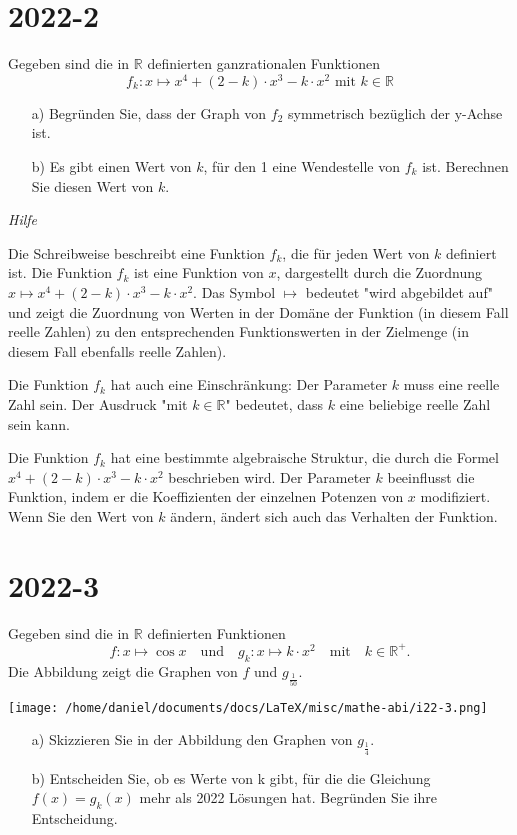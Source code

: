 \documentclass{article}
\begin{document}
\clearpage

\section*{2022-2}
Gegeben sind die in $\mathbb{R}$ definierten ganzrationalen Funktionen
\[f_k:x \mapsto x^4 + (2-k) \cdot x^3 -k \cdot x^2 \text{ mit } k\in\mathbb{R}\]

\begin{enumerate}
  \item[a)] Begr\"unden Sie, dass der Graph von $f_2$ symmetrisch bez\"uglich der y-Achse ist.

  \item[b)] Es gibt einen Wert von $k$, f\"ur den 1 eine Wendestelle von $f_k$
    ist. Berechnen Sie diesen Wert von $k$.
\end{enumerate}

\vfill

\textit{Hilfe}

Die Schreibweise beschreibt eine Funktion $f_k$, die für jeden Wert von $k$
definiert ist. Die Funktion $f_k$ ist eine Funktion von $x$, dargestellt durch
die Zuordnung $x\mapsto x^4 + (2-k) \cdot x^3 -k \cdot x^2$. Das Symbol
$\mapsto$ bedeutet "wird abgebildet auf" und zeigt die Zuordnung von Werten in
der Domäne der Funktion (in diesem Fall reelle Zahlen) zu den entsprechenden
Funktionswerten in der Zielmenge (in diesem Fall ebenfalls reelle Zahlen).

Die Funktion $f_k$ hat auch eine Einschränkung: Der Parameter $k$ muss eine
reelle Zahl sein. Der Ausdruck "mit $k\in\mathbb{R}$" bedeutet, dass $k$ eine
beliebige reelle Zahl sein kann.

Die Funktion $f_k$ hat eine bestimmte algebraische Struktur, die durch die
Formel $x^4 + (2-k) \cdot x^3 -k \cdot x^2$ beschrieben wird. Der Parameter $k$
beeinflusst die Funktion, indem er die Koeffizienten der einzelnen Potenzen von
$x$ modifiziert. Wenn Sie den Wert von $k$ ändern, ändert sich auch das
Verhalten der Funktion.


\clearpage
\section*{2022-3}
Gegeben sind die in $\mathbb{R}$ definierten Funktionen 
\[f:x\mapsto \cos x \quad\text{und}\quad g_k:x\mapsto k\cdot x^2 \quad
\text{mit}\quad k\in\mathbb{R}^+.\]
Die Abbildung zeigt die Graphen von $f$ und $g_{\frac{1}{50}}$.

\begin{center}
    \texttt{[image: /home/daniel/documents/docs/LaTeX/misc/mathe-abi/i22-3.png]}
\end{center}

\begin{enumerate}
  \item[a)] Skizzieren Sie in der Abbildung den Graphen von $g_{\frac{1}{4}}$.

  \item[b)] Entscheiden Sie, ob es Werte von k gibt, f\"ur die die Gleichung
    $f(x)=g_k(x)$ mehr als 2022 L\"osungen hat. Begr\"unden Sie ihre
    Entscheidung.
\end{enumerate}
\end{document}
